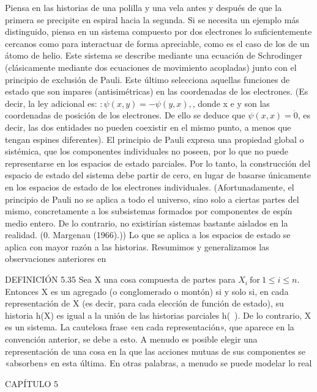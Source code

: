 \begin{justifying}
    Piensa en las historias de una polilla y una vela antes y después de que
    la primera se precipite en espiral hacia la segunda. Si se necesita un ejemplo más distinguido,
    piensa en un sistema compuesto por dos electrones lo suficientemente cercanos como para interactuar
    de forma apreciable, como es el caso de los de un átomo de helio. Este sistema se
    describe mediante una ecuación de Schrodinger (clásicamente mediante dos ecuaciones de movimiento acopladas) junto con el principio de exclusión de Pauli. Este último
    selecciona aquellas funciones de estado que son impares (antisimétricas) en las coordenadas de los electrones. (Es decir, la ley adicional es: $: \psi(x, y) = -\psi(y, x),$,
    donde x e y son las coordenadas de posición de los electrones. De ello se deduce
    que $\psi(x, x) = \dot{0}$, es decir, las dos entidades no pueden coexistir en el mismo punto,
    a menos que tengan espines diferentes). El principio de Pauli expresa una propiedad global
    o sistémica, que los componentes individuales no poseen,
    por lo que no puede representarse en los espacios de estado parciales. Por lo tanto,
    la construcción del espacio de estado del sistema debe partir de
    cero, en lugar de basarse únicamente en los espacios de estado de los electrones individuales.
    (Afortunadamente, el principio de Pauli no se aplica a todo el
    universo, sino solo a ciertas partes del mismo, concretamente a los subsistemas formados
    por componentes de espín medio entero. De lo contrario, no existirían sistemas bastante
    aislados en la realidad. (0. Margenau (1966).)) Lo que se aplica a los espacios de estado
    se aplica con mayor razón a las historias.
    Resumimos y generalizamos las observaciones anteriores en

    DEFINICIÓN 5.35 Sea X una cosa compuesta de partes para $X_{i} \ \text{for} \ 1 \le i \le n$.
    Entonces X es un agregado (o conglomerado o montón) si y solo si, en cada representación de X (es decir, para cada elección de función de estado), su historia h(X)
    es igual a la unión de las historias parciales h(~). De lo contrario, X es un sistema.
    La cautelosa frase «en cada representación», que aparece en la convención anterior, se debe a esto. A menudo es posible elegir una
    representación de una cosa en la que las acciones mutuas de sus componentes
    se «absorben» en esta última. En otras palabras, a menudo se puede modelar lo real

    \begin{center}
        CAPÍTULO 5
    \end{center}


\end{justifying}
